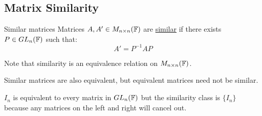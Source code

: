 \documentclass[../Main.tex]{subfiles}
\begin{document}
\subsection{Matrix Similarity}
\begin{definition}{Similar matrices}
    Matrices $A, A' \in M_{n \times n}(\mathbb{F})$ are \underline{similar} if there exists $P \in GL_n(\mathbb{F})$ such that:
    \begin{equation*}
        A' = P^{-1} A P
    \end{equation*}
\end{definition}
\begin{remarks}
    \item Note that similarity is an equivalence relation on $M_{n \times n}(\mathbb{F})$.
    \item Similar matrices are also equivalent, but equivalent matrices need not be similar.
\end{remarks}
\begin{example}
    $I_n$ is equivalent to every matrix in $GL_n(\mathbb{F})$ but the similarity class is $\{I_n\}$ because any matrices on the left and right will cancel out.
\end{example}
\end{document}

